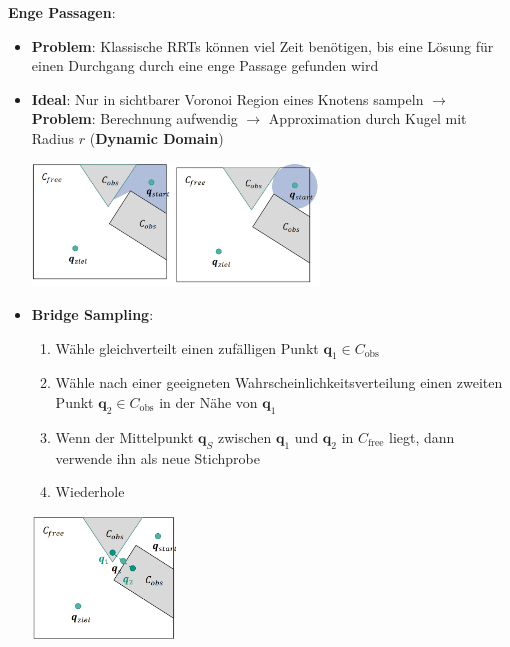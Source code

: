 \bigskip 
\textbf{Enge Passagen}:
\begin{itemize}
	\item \textbf{Problem}: Klassische RRTs können viel Zeit benötigen, bis eine Lösung für einen Durchgang durch eine enge Passage gefunden wird
	\item \textbf{Ideal}: Nur in sichtbarer Voronoi Region eines Knotens sampeln $\rightarrow$ \textbf{Problem}: Berechnung aufwendig $\rightarrow$ Approximation durch Kugel mit Radius $r$ (\textbf{Dynamic Domain})
	\begin{center}
		\includegraphics[width=0.6\textwidth]{images/voronoi-sichtbar.png}
	\end{center}
	\item \textbf{Bridge Sampling}: 
	\begin{enumerate}
		\item Wähle gleichverteilt einen zufälligen Punkt $\mathbf{q}_1\in C_\text{obs}$
		\item Wähle nach einer geeigneten Wahrscheinlichkeitsverteilung einen zweiten Punkt $\mathbf{q}_2\in C_\text{obs}$ in der Nähe von $\mathbf{q}_1$
		\item Wenn der Mittelpunkt $\mathbf{q}_S$ zwischen $\mathbf{q}_1$
		und $\mathbf{q}_2$ in $C_\text{free}$ liegt, dann verwende ihn als neue Stichprobe
		\item Wiederhole
	\end{enumerate}
	\begin{center}
		\includegraphics[width=0.3\textwidth]{images/bridge-sampling.png}
	\end{center}
\end{itemize}
